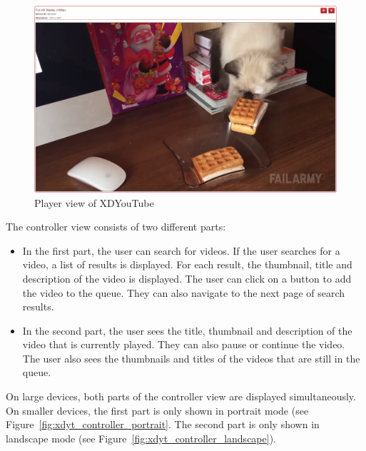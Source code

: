 \begin{figure}[H]
  \centering
    \includegraphics[width=1.0\textwidth]{images/screenshots/xdyt/player_2.png}
	\caption[Screenshot XDYouTube: Player view]{Player view of XDYouTube}
	\label{fig:xdyt_player}
\end{figure}

The controller view consists of two different parts:
\begin{itemize}
	\item In the first part, the user can search for videos. If the user searches for a video, a list of results is displayed. For each result, the thumbnail, title and description of the video is displayed. The user can click on a button to add the video to the queue. They can also navigate to the next page of search results.
	\item In the second part, the user sees the title, thumbnail and description of the video that is currently played. They can also pause or continue the video. The user also sees the thumbnails and titles of the videos that are still in the queue. 
\end{itemize}

On large devices, both parts of the controller view are displayed simultaneously. On smaller devices, the first part is only shown in portrait mode (see Figure~\ref{fig:xdyt_controller_portrait}. The second part is only shown in landscape mode (see Figure~\ref{fig:xdyt_controller_landscape}).

